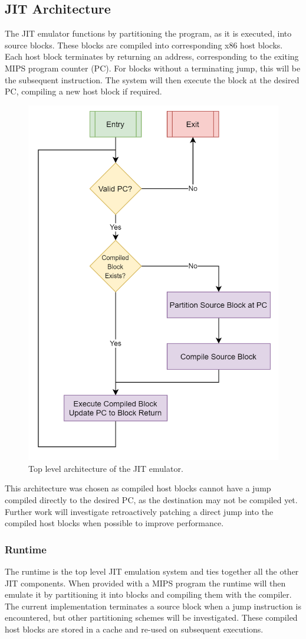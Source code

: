 \subsection{JIT Architecture}

The JIT emulator functions by partitioning the program, as it is executed, into source blocks. These blocks are compiled into corresponding x86 host blocks. Each host block terminates by returning an address, corresponding to the exiting MIPS program counter (PC). For blocks without a terminating jump, this will be the subsequent instruction. The system will then execute the block at the desired PC, compiling a new host block if required.

\begin{figure}[h]
    \centering
    \includegraphics[width=0.5\linewidth]{diagrams/jit.png}
    \caption{Top level architecture of the JIT emulator.}
    \label{figure:jit-arch}
\end{figure}

This architecture was chosen as compiled host blocks cannot have a jump compiled directly to the desired PC, as the destination may not be compiled yet. Further work will investigate retroactively patching a direct jump into the compiled host blocks when possible to improve performance.

\subsubsection{Runtime}

The runtime is the top level JIT emulation system and ties together all the other JIT components. When provided with a MIPS program the runtime will then emulate it by partitioning it into blocks and compiling them with the compiler. The current implementation terminates a source block when a jump instruction is encountered, but other partitioning schemes will be investigated. These compiled host blocks are stored in a cache and re-used on subsequent executions.

